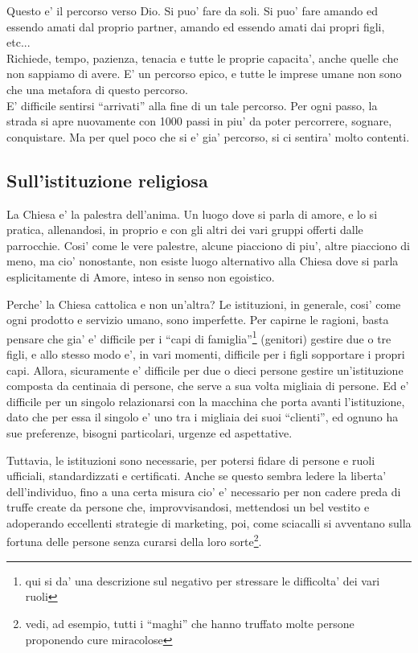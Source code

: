 Questo e' il percorso verso Dio. Si puo' fare da soli. Si puo' fare amando ed essendo amati dal proprio partner, amando ed essendo amati dai propri figli, etc...\\
Richiede, tempo, pazienza, tenacia e tutte le proprie capacita', anche quelle che non sappiamo di avere. E' un percorso epico, e tutte le imprese umane non sono che una metafora di questo percorso. \\

E' difficile sentirsi ``arrivati'' alla fine di un tale percorso. Per ogni passo, la strada si apre nuovamente con 1000 passi in piu' da poter percorrere, sognare, conquistare. Ma per quel poco che si e' gia' percorso, si ci sentira' molto contenti.

\subsection{Sull'istituzione religiosa}
La Chiesa e' la palestra dell'anima. Un luogo dove si parla di amore, e lo si pratica, allenandosi, in proprio e con gli altri dei vari gruppi offerti dalle parrocchie. Cosi' come le vere palestre, alcune piacciono di piu', altre piacciono di meno, ma cio' nonostante, non esiste luogo alternativo alla Chiesa dove si parla esplicitamente di Amore, inteso in senso non egoistico. 

Perche' la Chiesa cattolica e non un'altra? Le istituzioni, in generale, cosi' come ogni prodotto e servizio umano, sono imperfette. Per capirne le ragioni, basta pensare che gia' e' difficile per i ``capi di famiglia''\footnote{qui si da' una descrizione sul negativo per stressare le difficolta' dei vari ruoli} (genitori) gestire due o tre figli, e allo stesso modo e', in vari momenti, difficile per i figli sopportare i propri capi. Allora, sicuramente e' difficile per due o dieci persone gestire un'istituzione composta da centinaia di persone, che serve a sua volta migliaia di persone. Ed e' difficile per un singolo relazionarsi con la macchina che porta avanti l'istituzione, dato che per essa il singolo e' uno tra i migliaia dei suoi ``clienti'', ed ognuno ha sue preferenze, bisogni particolari, urgenze ed aspettative.

Tuttavia, le istituzioni sono necessarie, per potersi fidare di persone e ruoli ufficiali, standardizzati e certificati. Anche se questo sembra ledere la liberta' dell'individuo, fino a una certa misura cio' e' necessario per non cadere preda di truffe create da persone che, improvvisandosi, mettendosi un bel vestito e adoperando eccellenti strategie di marketing, poi, come sciacalli si avventano sulla fortuna delle persone senza curarsi della loro sorte\footnote{vedi, ad esempio, tutti i ``maghi'' che hanno truffato molte persone proponendo cure miracolose}.


